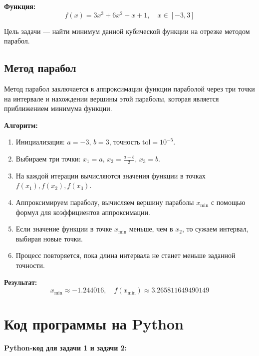 \documentclass[a4paper,12pt]{article}
\begin{document}
\textbf{Функция:}
\[
f(x) = 3x^3 + 6x^2 + x + 1, \quad x \in [-3, 3]
\]

Цель задачи — найти минимум данной кубической функции на отрезке методом парабол.

\subsection{Метод парабол}

Метод парабол заключается в аппроксимации функции параболой через три точки на интервале и нахождении вершины этой параболы, которая является приближением минимума функции.

\textbf{Алгоритм:}
\begin{enumerate}
    \item Инициализация: \( a = -3 \), \( b = 3 \), точность \( \text{tol} = 10^{-5} \).
    \item Выбираем три точки: \( x_1 = a \), \( x_2 = \frac{a + b}{2} \), \( x_3 = b \).
    \item На каждой итерации вычисляются значения функции в точках \( f(x_1), f(x_2), f(x_3) \).
    \item Аппроксимируем параболу, вычисляем вершину параболы \( x_{\text{min}} \) с помощью формул для коэффициентов аппроксимации.
    \item Если значение функции в точке \( x_{\text{min}} \) меньше, чем в \( x_2 \), то сужаем интервал, выбирая новые точки.
    \item Процесс повторяется, пока длина интервала не станет меньше заданной точности.
\end{enumerate}

\textbf{Результат:}
\[
x_{\text{min}} \approx -1.244016, \quad f(x_{\text{min}}) \approx 3.265811649490149
\]

\section{Код программы на Python}

\textbf{Python-код для задачи 1 и задачи 2:}
\end{document}
